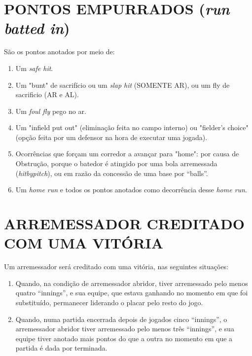 \section{PONTOS EMPURRADOS (\textit{run batted in}) }
\begin{multicols}{2}
	São os pontos anotados por meio de:

	\begin{enumerate}[label=\alph*)]
		\item Um \textit{safe hit}.

		\item  Um "bunt" de sacrifício ou um \textit{slap hit} (SOMENTE AR), ou um \gls{fly de sacrificio} (AR e AL).

		\item  Um \textit{foul fly} pego no ar.
		\item Um "infield put out" (eliminação feita no campo interno) ou "fielder's choice"
		(opção feita por um defensor na hora de executar uma jogada).

		\item  Ocorrências que forçam um corredor a avançar para "home": por causa de
		Obstrução, porque o batedor é atingido por uma bola arremessada (\textit{hitbypitch}), ou
		em razão da concessão de uma base por “balls”.

		\item  Um \textit{home run} e todos os pontos anotados como decorrência desse \textit{home run}.
	\end{enumerate}
\end{multicols}
\section{ARREMESSADOR CREDITADO COM UMA VITÓRIA }
\begin{multicols}{2}
	Um arremessador será creditado com uma vitória, nas seguintes situações:

	\begin{enumerate}[label=\alph*)]
		\item Quando, na condição de arremessador abridor, tiver arremessado pelo menos
		quatro “innings”, e sua equipe, que estava ganhando no momento em que foi
		substituído, permanecer liderando o placar pelo resto do jogo.

		\item  Quando, numa partida encerrada depois de jogados cinco “innings”, o arremessador
		abridor tiver arremessado pelo menos três “innings”, e sua equipe tiver anotado mais
		pontos do que a outra no momento em que a partida é dada por terminada.
	\end{enumerate}
\end{multicols}
